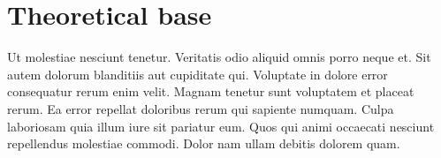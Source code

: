 \newpage
\section{Theoretical base}

Ut molestiae nesciunt tenetur. Veritatis odio aliquid omnis porro neque et. Sit autem dolorum blanditiis aut cupiditate qui.
Voluptate in dolore error consequatur rerum enim velit. Magnam tenetur sunt voluptatem et placeat rerum. Ea error repellat doloribus rerum qui sapiente numquam. Culpa laboriosam quia illum iure sit pariatur eum. Quos qui animi occaecati nesciunt repellendus molestiae commodi. Dolor nam ullam debitis dolorem quam.